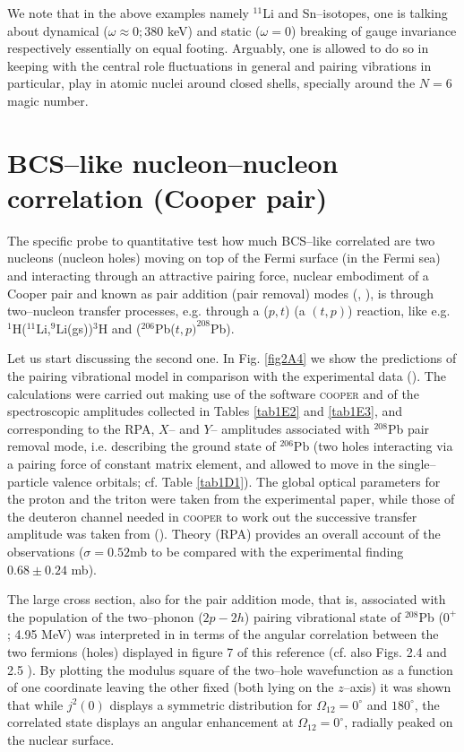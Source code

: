 We note that in the above examples namely $^{11}$Li and Sn--isotopes, one is talking about dynamical ($\omega\approx 0; 380$ keV) and static ($\omega=0$) breaking of gauge invariance respectively essentially on equal footing. Arguably, one is allowed to do so in keeping with the central role fluctuations in general and pairing vibrations in particular, play in atomic nuclei around closed shells, specially around the $N=6$ magic number.




\section[BCS--like correlation]{BCS--like nucleon--nucleon correlation (Cooper pair)}\label{C6S3}
The specific probe to quantitative test how much BCS--like correlated are two nucleons (nucleon holes) moving on top of the Fermi surface (in the Fermi sea) and interacting through an attractive pairing force, nuclear embodiment of a Cooper pair and known as pair addition (pair removal) modes (\cite{Bohr:75}, \cite{Bes:66}), is through two--nucleon transfer processes, e.g. through a ($p,t$) (a $(t,p)$) reaction, like e.g. $^{1}$H($^{11}$Li,$^{9}$Li(gs))$^{3}$H and ($^{206}$Pb($t,p)^{208}$Pb).



Let us start discussing the second one. In Fig. \ref{fig2A4} we show the predictions of the pairing vibrational model in comparison with the experimental data (\cite{Bjerregaard:66b}). The calculations were carried out making use of the software \textsc{cooper} and of the spectroscopic amplitudes collected in Tables \ref{tab1E2} and \ref{tab1E3}, and corresponding to the RPA, $X$-- and $Y$-- amplitudes associated with $^{208}$Pb pair removal mode, i.e. describing the ground state of  $^{206}$Pb (two holes interacting via a pairing force of constant matrix element, and allowed to move in the single--particle valence orbitals; cf. Table \ref{tab1D1}). The global optical parameters for the proton and the triton were taken from the experimental paper, while those of the deuteron channel needed in \textsc{cooper} to work out the successive transfer amplitude was taken from (\cite{An:06}). Theory (RPA) provides an overall account of the observations ($\sigma=0.52 $mb to be compared with the experimental finding $0.68\pm 0.24$ mb).


The large cross section, also for the pair addition mode, that is, associated with the population of the two--phonon ($2p-2h$) pairing vibrational state of $^{208}$Pb ($0^{+}$; 4.95 MeV)
was interpreted in \cite{Bertsch:67} in terms of the angular correlation between the two fermions (holes) displayed in figure 7 of this reference (cf. also Figs. 2.4 and 2.5 \cite{Brink:05}). By plotting the modulus square of the two--hole wavefunction as a function of one coordinate leaving the other fixed (both lying on the $z$--axis) it was shown that while $j^2(0)$ displays a symmetric distribution for $\Omega_{12}=0^\circ$ and $180^\circ$, the correlated state displays an angular enhancement at $\Omega_{12}=0^\circ$, radially peaked on the nuclear surface.


